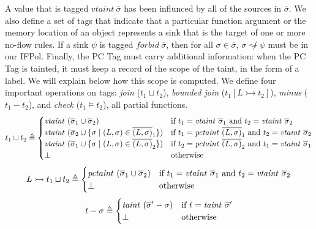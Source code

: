 \documentclass[acmsmall,review,anonymous]{acmart}\settopmatter{printfolios=true,printccs=false,printacmref=false}
\begin{document}
A value that is tagged \(\mathit{vtaint} ~ \overline{\sigma}\) has been influnced
by all of the sources in \(\overline{\sigma}\). We also define a set of tags that indicate that a
particular function argument or the memory location of an object represents a sink that is the
target of one or more no-flow rules. If a sink \(\psi\) is tagged
\(\mathit{forbid} ~ \overline{\sigma}\), then for all \(\sigma \in \overline{\sigma}\),
\(\sigma \not \rightsquigarrow \psi\) must be in our IFPol. Finally, the PC Tag must carry additional
information: when the PC Tag is tainted, it must keep a record of the scope of the taint, in the form
of a label. We will explain below how this scope is computed.
%
%
We define four important operations on tags: {\em join} (\(t_1 \sqcup t_2\)), {\em bounded join}
(\(t_1 [L \rightarrowtail t_2]\)), {\em minus} (\(t_1 - t_2\)), and {\em check} (\(t_1 \models t_2\)),
all partial functions.
%
\[t_1 \sqcup t_2 \triangleq
\begin{cases}
  \mathit{vtaint} ~ (\overline{\sigma}_1 \cup \overline{\sigma}_2) &
  \textnormal{if } t_1 = \mathit{vtaint} ~ \overline{\sigma}_1 \textnormal{ and }
  t_2 = \mathit{vtaint} ~ \overline{\sigma}_2\\
  \mathit{vtaint} ~ (\overline{\sigma}_2 \cup \{\sigma \mid (L,\sigma) \in \overline{(L,\sigma)}_1\}) &
  \textnormal{if } t_1 = \mathit{pctaint} ~ \overline{(L,\sigma)}_1 \textnormal{ and }
  t_2 = \mathit{vtaint} ~ \overline{\sigma}_2\\
  \mathit{vtaint} ~ (\overline{\sigma}_1 \cup \{\sigma \mid (L,\sigma) \in \overline{(L,\sigma)}_2\}) &
  \textnormal{if } t_2 = \mathit{pctaint} ~ \overline{(L,\sigma)}_2 \textnormal{ and }
  t_1 = \mathit{vtaint} ~ \overline{\sigma}_1\\
  \bot & \textnormal{otherwise} \\
\end{cases}\]
%
\[L \rightarrowtail t_1 \sqcup t_2 \triangleq
\begin{cases}
  \mathit{pctaint} ~ (\overline{\sigma}_1 \cup \overline{\sigma}_2) &
  \textnormal{if } t_1 = \mathit{vtaint} ~ \overline{\sigma}_1 \textnormal{ and }
  t_2 = \mathit{vtaint} ~ \overline{\sigma}_2\\
  \bot & \textnormal{otherwise} \\
\end{cases}\]
%
\[t - \sigma \triangleq
\begin{cases}
  \mathit{taint} ~ (\overline{\sigma}' - \sigma) &
  \textnormal{if } t = \mathit{taint} ~ \overline{\sigma}' \\
  \bot & \textnormal{otherwise} \\
\end{cases}\]
\end{document}
